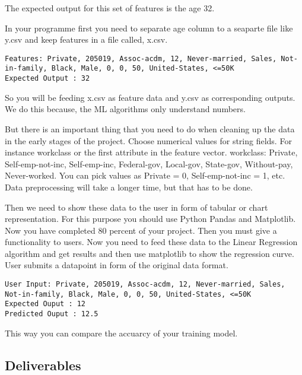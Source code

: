 The expected output for this set of features is the age 32.

In your programme first you need to separate age column to a seaparte
file like y.csv and keep features in a file called, x.csv.
\begin{lstlisting}
Features: Private, 205019, Assoc-acdm, 12, Never-married, Sales, Not-in-family, Black, Male, 0, 0, 50, United-States, <=50K
Expected Output : 32
\end{lstlisting}

So you will be feeding x.csv as feature data and y.csv as
corresponding outputs. We do this because, the ML algorithms only
understand numbers.

But there is an important thing that you need to do when cleaning up
the data in the early stages of the project. Choose numerical values
for string fields.  For instance workclass or the first attribute in
the feature vector.  workclass: Private, Self-emp-not-inc,
Self-emp-inc, Federal-gov, Local-gov, State-gov, Without-pay,
Never-worked.  You can pick values as Private = 0, Self-emp-not-inc =
1, etc. Data preprocessing will take a longer time, but that has to be done. 


Then we need to show these data to the user in form of tabular or
chart representation. For this purpose you should use Python Pandas
and Matplotlib.  Now you have completed 80 percent of your
project. Then you must give a functionality to users. Now you need to
feed these data to the Linear Regression algorithm and get results and
then use matplotlib to show the regression curve. User submits a datapoint
in form of the original data format.

\begin{lstlisting}
User Input: Private, 205019, Assoc-acdm, 12, Never-married, Sales, Not-in-family, Black, Male, 0, 0, 50, United-States, <=50K
Expected Ouput : 12
Predicted Ouput : 12.5
\end{lstlisting}

This way you can compare the accuarcy of your training model.


\subsection{Deliverables}

